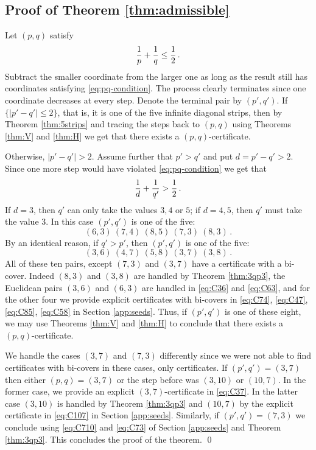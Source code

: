 \documentclass[11pt]{article}
\theoremstyle{remark}
\begin{document}
\subsection{Proof of Theorem \ref{thm:admissible}} Let $(p,q)$ satisfy 
\begin{equation}\label{eq:pq-condition}
{1 \over p} + {1\over q} \leq {1 \over 2} \, .
\end{equation} Subtract the smaller coordinate from the larger one as long as the result still has coordinates satisfying \eqref{eq:pq-condition}. The process clearly terminates since one coordinate decreases at every step. Denote the terminal pair by $(p',q')$. If $\{|p'-q'|\leq 2\}$, that is, it is one of the five infinite diagonal strips, then by Theorem \ref{thm:5strips} and tracing the steps back to $(p,q)$ using Theorems \ref{thm:V} and \ref{thm:H} we get that there exists a $(p,q)$-certificate. 

Otherwise, $|p'-q'|> 2$. Assume further that $p'>q'$ and put $d=p'-q'>2$. Since one more step would have violated \eqref{eq:pq-condition} we get that 
$$ {1 \over d} + {1 \over q'} > {1 \over 2} \, .$$
If $d=3$, then $q'$ can only take the values $3,4$ or $5$; if $d=4,5$, then $q'$ must take the value $3$. In this case $(p',q')$ is one of the five:
$$(6,3)\ (7,4)\ (8,5)\  (7,3)\ (8,3) \, .$$
By an identical reason, if $q' > p'$, then $(p',q')$ is one of the five:
$$ (3,6)\ (4,7)\ (5,8)\ (3,7)\ (3,8)  \, .$$
All of these ten pairs, except $(7,3)$ and $(3,7)$ have a certificate with a bi-cover. Indeed $(8,3)$ and $(3,8)$ are handled by Theorem \ref{thm:3qp3}, the Euclidean pairs $(3,6)$ and $(6,3)$ are handled in \eqref{eq:C36} and \eqref{eq:C63}, and for the other four we provide explicit certificates with bi-covers in \eqref{eq:C74}, \eqref{eq:C47}, \eqref{eq:C85}, \eqref{eq:C58} in Section \ref{app:seeds}. Thus, if $(p',q')$ is one of these eight, we may use Theorems \ref{thm:V} and \ref{thm:H} to conclude that there exists a $(p,q)$-certificate. 

We handle the cases $(3,7)$ and $(7,3)$ differently since we were not able to find certificates with bi-covers in these cases, only certificates. If $(p',q')=(3,7)$ then either $(p,q)=(3,7)$ or the step before was $(3,10)$ or $(10,7)$. In the former case, we provide an explicit $(3,7)$-certificate in \eqref{eq:C37}. In the latter case $(3,10)$ is handled by Theorem \ref{thm:3qp3} and $(10,7)$ by the explicit certificate in \eqref{eq:C107} in Section \ref{app:seeds}. Similarly, if $(p',q')=(7,3)$ we conclude using \eqref{eq:C710} and \eqref{eq:C73} of Section \ref{app:seeds} and Theorem \ref{thm:3qp3}. This concludes the proof of the theorem. \qed
\end{document}
